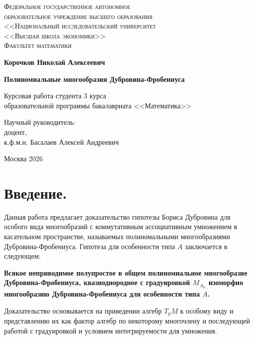 \documentclass[a4paper, 10pt]{article}
\theoremstyle{plain}
\begin{document}
\begin{center}
	{\scshape Федеральное государственное автономное\\
	образовательное учреждение высшего образования\\
	<<Национальный исследовательский университет\\
	<<Высшая школа экономики>>\\[1ex]
	Факультет математики}\par
	\par\vfill
	\textbf{\large Корочков Николай Алексеевич}
	\vspace{1.5cm}
	{\Large\bfseries
	Полиномиальные многообразия Дубровина-Фробениуса \par}
	\vspace{1.5cm}
	Курсовая работа студента 3 курса\\[1ex]
	образовательной программы бакалавриата <<Математика>>
	\par\vfill
	\noindent\hspace{0.52\textwidth}\parbox[t]{0.48\textwidth}{%
	Научный руководитель:\\[3pt]
	доцент,\\
	к.ф.м.н. Басалаев Алексей Андреевич\\[2ex]
	}%
	\par\vfill
	Москва 2026
\end{center}
\thispagestyle{empty}
\pagebreak
\section{Введение.}
Данная работа предлагает доказательство гипотезы Бориса Дубровина для особого вида многообразий с коммутативным ассоциативным умножением в касательном пространстве, называемых полиномальными многообразиями Дубровина-Фробениуса. Гипотеза для особенности типа \(A\) заключается в следующем: 
\begin{center}
\textbf{
    Всякое неприводимое полупростое в общем полиномиальное многообразие Дубровина-Фробениуса, квазиоднородное с градуировкой \(M_{A_\mu}\) изоморфно многообразию Дубровина-Фробениуса для особенности типа \(A\).
    }
\end{center}
Доказательство основывается на приведении алгебр \(T_pM\) к особому виду и представлению их как фактор алгебр по некоторому многочлену и последующей работой с градуировкой и условием интегрируемости для умножения.
\end{document}
